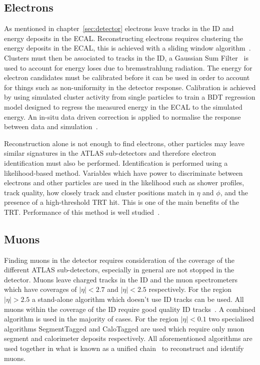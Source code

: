 \subsection{Electrons}
\label{subsec:electrons}

As mentioned in chapter~\ref{sec:detector} electrons leave tracks in the ID and
energy deposits in the ECAL. Reconstructing electrons requires clustering the
energy deposits in the ECAL, this is achieved with a sliding window
algorithm~\cite{slide}. Clusters must then be associated to tracks in the ID, a
Gaussian Sum Filter~\cite{GSF} is used to account for energy loses due to
bremsstrahlung radiation. The energy for electron candidates must be calibrated
before it can be used in order to account for things such as non-uniformity in
the detector response. Calibration is achieved by using simulated cluster
activity from single particles to train a BDT regression model designed to
regress the measured energy in the ECAL to the simulated energy. An in-situ data
driven correction is applied to normalise the response between data and
simulation~\cite{elec-calibration}.

Reconstruction alone is not enough to find electrons, other particles may leave
similar signatures in the ATLAS sub-detectors and therefore electron
identification must also be performed. Identification is performed using a
likelihood-based method. Variables which have power to discriminate between
electrons and other particles are used in the likelihood such as shower
profiles, track quality, how closely track and cluster positions match in $\eta$
and $\phi$, and the presence of a high-threshold TRT hit. This is one of the
main benefits of the TRT. Performance of this method is well
studied~\cite{2likelihood-electron-id-notes}.

\subsection{Muons}

Finding muons in the detector requires consideration of the coverage of the
different ATLAS sub-detectors, especially in general are not stopped in the
detector. Muons leave charged tracks in the ID and the muon spectrometers which
have coverages of $\lvert \eta \rvert < 2.7$ and $\lvert \eta \rvert < 2.5$
respectively. For the region $\lvert \eta \rvert > 2.5$ a stand-alone algorithm
which doesn't use ID tracks can be used. All muons within the coverage of the ID
require good quality ID tracks~\cite{}. A combined algorithm is used in the
majority of cases. For the region $\lvert  \eta  \rvert < 0.1$ two specialised
algorithms SegmentTagged and CaloTagged are used which require only muon segment
and calorimeter deposits respectively. All aforementioned algorithms are used
together in what is known as a unified chain~\cite{muon-reco-id} to reconstruct and identify
muons.


